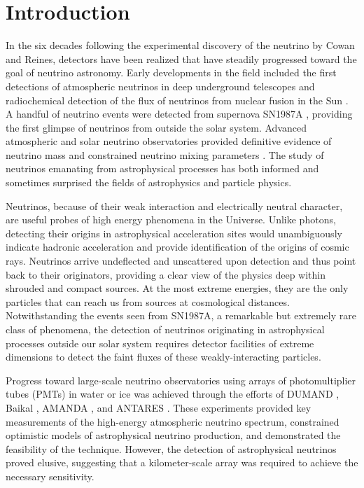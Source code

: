 
\section{Introduction}
\label{sec:intro}

In the six decades following the experimental
discovery of the neutrino by Cowan and Reines, detectors have been realized
that have steadily progressed toward the goal of neutrino
astronomy.  Early developments in the field included the first detections of
atmospheric neutrinos in deep underground telescopes \cite{Achar,Witwatersrand} and
radiochemical detection of the flux of neutrinos from
nuclear fusion in the Sun \cite{Homestake}. A handful of neutrino
events were detected from supernova SN1987A
\cite{SK1987A,IMB1987A,BUST1987A}, providing the first glimpse of neutrinos
from outside the solar system.  Advanced
atmospheric and solar neutrino observatories provided definitive
evidence of neutrino mass and constrained neutrino mixing
parameters \cite{SK,SNO}.  The study of neutrinos emanating from astrophysical
processes has both informed and sometimes surprised the fields of
astrophysics and particle physics. 

Neutrinos, because of their weak interaction and electrically neutral character, are useful probes of high
energy phenomena in the Universe. Unlike photons, detecting their origins in astrophysical
acceleration sites would unambiguously indicate hadronic acceleration and
provide identification of the origins of cosmic rays. Neutrinos arrive 
undeflected and unscattered upon detection and thus point back to their
originators, providing
a clear view of the physics deep within shrouded and compact sources. At
the most extreme energies, they are the only particles that can reach 
us from sources at cosmological distances. Notwithstanding the events seen from SN1987A, a remarkable but
extremely rare class of phenomena, the detection of neutrinos originating in
astrophysical processes outside our solar system requires detector facilities of
extreme dimensions to detect the faint fluxes of these weakly-interacting
particles. 

Progress toward large-scale neutrino observatories using arrays of
photomultiplier tubes (PMTs) in water or ice was achieved through the efforts of
DUMAND \cite{DUMAND}, Baikal \cite{Baikal}, AMANDA \cite{AMANDA:detector}, and
ANTARES \cite{ANTARES}.  These experiments provided key measurements of the
high-energy atmospheric neutrino spectrum, constrained optimistic models of
astrophysical neutrino production, and demonstrated the feasibility of the
technique. However, the detection of astrophysical neutrinos proved
elusive, suggesting that a kilometer-scale array was required to achieve the necessary sensitivity.  

